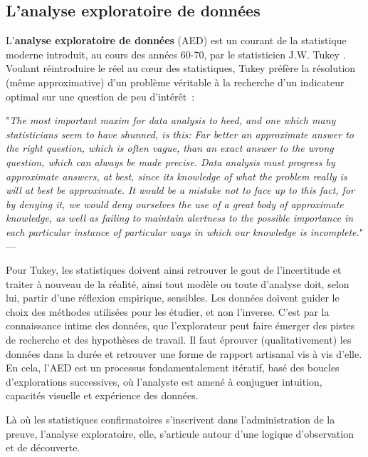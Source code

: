 \documentclass[symmetric,justified,marginals=raggedouter]{tufte-book}
\begin{document}
\subsection{L'analyse exploratoire de données}

\noindent L'\textbf{analyse exploratoire de données} (AED) est un courant de la statistique moderne introduit, au cours des années 60-70, par le statisticien J.W. Tukey \citep{tukey_exploratory_1977}. Voulant réintroduire le réel au cœur des statistiques, Tukey préfère la résolution (même approximative) d'un problème véritable à la recherche d'un indicateur optimal sur une question de peu d'intérêt~:\\

\begin{fullwidth}
"\textit{The most important maxim for data analysis to heed, and one which many statisticians seem to have shunned, is this: Far better an approximate answer to the right question, which is often vague, than an exact answer to the wrong question, which can always be made precise. Data analysis must progress by approximate answers, at best, since its knowledge of what the problem really is will at best be approximate. It would be a mistake not to face up to this fact, for by denying it, we would deny ourselves the use of a great body of approximate knowledge, as well as failing to maintain alertness to the possible importance in each particular instance of particular ways in which our knowledge is incomplete.}" --- \citep[p13-14]{tukey_future_1962}\\
\end{fullwidth}

\noindent Pour Tukey, les statistiques doivent ainsi retrouver le gout de l'in\-certitude et traiter à nouveau de la réalité, ainsi tout modèle ou toute d'analyse doit, selon lui, partir d'une réflexion empirique, sensibles. Les données doivent guider le choix des méthodes utilisées pour les étudier, et non l'inverse. C'est par la connaissance intime des données, que l'explorateur peut faire émerger des pistes de recherche et des hypothèses de travail. Il faut éprouver (qualitativement) les données dans la durée et retrouver une forme de rapport artisanal vis à vis d'elle. En cela, l'AED est un processus fondamentalement itératif, basé des boucles d'explorations successives, où l'analyste est amené à conjuguer intuition, capacités visuelle et expérience des données.

Là où les statistiques confirmatoires s'inscrivent dans l'administra\-tion de la preuve, l'analyse exploratoire, elle, s'articule autour d'une logique d'observation et de découverte.  
\end{document}

